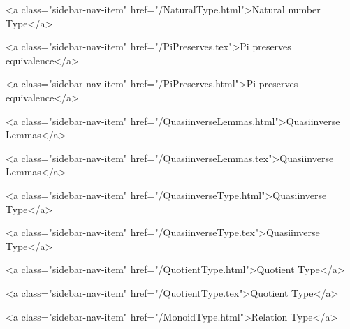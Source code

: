       
    
      
        
      
    
      
        
          <a class="sidebar-nav-item" href="/NaturalType.html">Natural number Type</a>
        
      
    
      
        
          <a class="sidebar-nav-item" href="/PiPreserves.tex">Pi preserves equivalence</a>
        
      
    
      
        
          <a class="sidebar-nav-item" href="/PiPreserves.html">Pi preserves equivalence</a>
        
      
    
      
        
          <a class="sidebar-nav-item" href="/QuasiinverseLemmas.html">Quasiinverse Lemmas</a>
        
      
    
      
        
          <a class="sidebar-nav-item" href="/QuasiinverseLemmas.tex">Quasiinverse Lemmas</a>
        
      
    
      
        
          <a class="sidebar-nav-item" href="/QuasiinverseType.html">Quasiinverse Type</a>
        
      
    
      
        
          <a class="sidebar-nav-item" href="/QuasiinverseType.tex">Quasiinverse Type</a>
        
      
    
      
        
          <a class="sidebar-nav-item" href="/QuotientType.html">Quotient Type</a>
        
      
    
      
        
          <a class="sidebar-nav-item" href="/QuotientType.tex">Quotient Type</a>
        
      
    
      
        
          <a class="sidebar-nav-item" href="/MonoidType.html">Relation Type</a>
        
      
    

